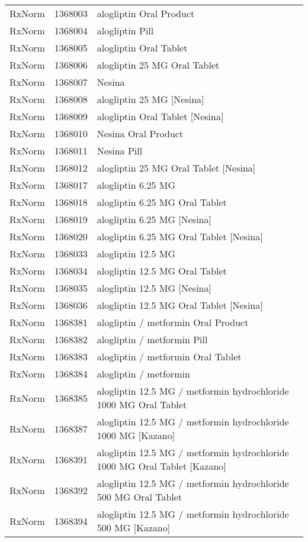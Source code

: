 \begin{longtable}{p{}p{}p{}}
  RxNorm & 1368003 & alogliptin Oral Product \\ 
  RxNorm & 1368004 & alogliptin Pill \\ 
  RxNorm & 1368005 & alogliptin Oral Tablet \\ 
  RxNorm & 1368006 & alogliptin 25 MG Oral Tablet \\ 
  RxNorm & 1368007 & Nesina \\ 
  RxNorm & 1368008 & alogliptin 25 MG [Nesina] \\ 
  RxNorm & 1368009 & alogliptin Oral Tablet [Nesina] \\ 
  RxNorm & 1368010 & Nesina Oral Product \\ 
  RxNorm & 1368011 & Nesina Pill \\ 
  RxNorm & 1368012 & alogliptin 25 MG Oral Tablet [Nesina] \\ 
  RxNorm & 1368017 & alogliptin 6.25 MG \\ 
  RxNorm & 1368018 & alogliptin 6.25 MG Oral Tablet \\ 
  RxNorm & 1368019 & alogliptin 6.25 MG [Nesina] \\ 
  RxNorm & 1368020 & alogliptin 6.25 MG Oral Tablet [Nesina] \\ 
  RxNorm & 1368033 & alogliptin 12.5 MG \\ 
  RxNorm & 1368034 & alogliptin 12.5 MG Oral Tablet \\ 
  RxNorm & 1368035 & alogliptin 12.5 MG [Nesina] \\ 
  RxNorm & 1368036 & alogliptin 12.5 MG Oral Tablet [Nesina] \\ 
  RxNorm & 1368381 & alogliptin / metformin Oral Product \\ 
  RxNorm & 1368382 & alogliptin / metformin Pill \\ 
  RxNorm & 1368383 & alogliptin / metformin Oral Tablet \\ 
  RxNorm & 1368384 & alogliptin / metformin \\ 
  RxNorm & 1368385 & alogliptin 12.5 MG / metformin hydrochloride 1000 MG Oral Tablet \\ 
  RxNorm & 1368387 & alogliptin 12.5 MG / metformin hydrochloride 1000 MG [Kazano] \\ 
  RxNorm & 1368391 & alogliptin 12.5 MG / metformin hydrochloride 1000 MG Oral Tablet [Kazano] \\ 
  RxNorm & 1368392 & alogliptin 12.5 MG / metformin hydrochloride 500 MG Oral Tablet \\ 
  RxNorm & 1368394 & alogliptin 12.5 MG / metformin hydrochloride 500 MG [Kazano] \\ 

\end{longtable}
